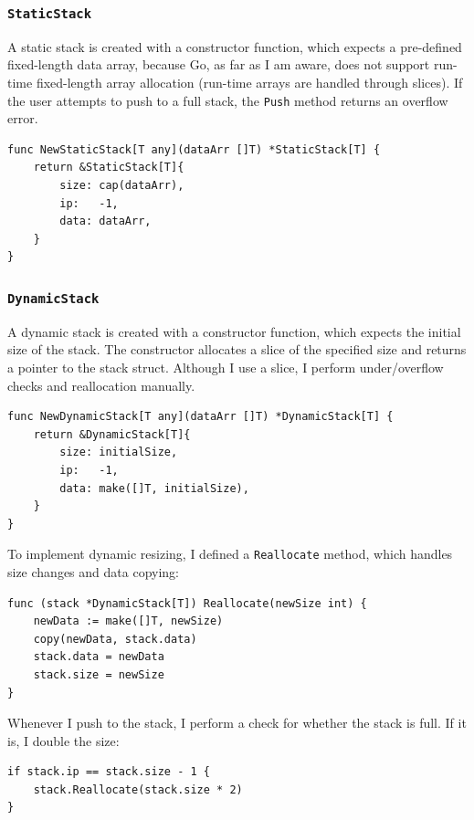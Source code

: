 \documentclass[a4paper,11pt]{article}
\begin{document}
    \subsubsection*{\texttt{StaticStack}}

    A static stack is created with a constructor function, which expects a pre-defined fixed-length data array, because Go, as far as I am aware, does not support run-time fixed-length array allocation (run-time arrays are handled through slices). If the user attempts to push to a full stack, the \texttt{Push} method returns an overflow error.

    \begin{verbatim}
func NewStaticStack[T any](dataArr []T) *StaticStack[T] {
    return &StaticStack[T]{
        size: cap(dataArr),
        ip:   -1,
        data: dataArr,
    }
}
    \end{verbatim}

    \subsubsection*{\texttt{DynamicStack}}

    A dynamic stack is created with a constructor function, which expects the initial size of the stack. The constructor allocates a slice of the specified size and returns a pointer to the stack struct. Although I use a slice, I perform under/overflow checks and reallocation manually.

    \begin{verbatim}
func NewDynamicStack[T any](dataArr []T) *DynamicStack[T] {
    return &DynamicStack[T]{
        size: initialSize,
        ip:   -1,
        data: make([]T, initialSize),
    }
}
    \end{verbatim}

    To implement dynamic resizing, I defined a \texttt{Reallocate} method, which handles size changes and data copying:

    \begin{verbatim}
func (stack *DynamicStack[T]) Reallocate(newSize int) {
    newData := make([]T, newSize)
    copy(newData, stack.data)
    stack.data = newData
    stack.size = newSize
}
    \end{verbatim}

    Whenever I push to the stack, I perform a check for whether the stack is full. If it is, I double the size:
    \begin{verbatim}
if stack.ip == stack.size - 1 {
    stack.Reallocate(stack.size * 2)
}
    \end{verbatim}
\end{document}

